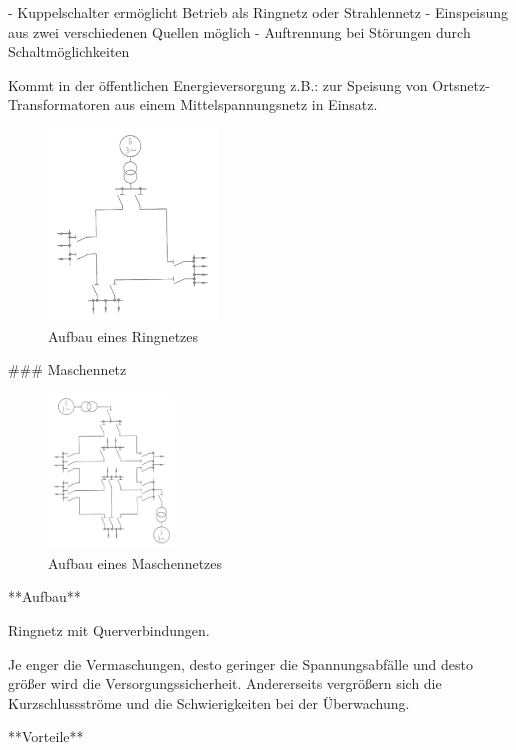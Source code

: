 \begin{markdown}
- Kuppelschalter ermöglicht Betrieb als Ringnetz oder Strahlennetz
- Einspeisung aus zwei verschiedenen Quellen möglich
- Auftrennung bei Störungen durch Schaltmöglichkeiten

Kommt in der öffentlichen Energieversorgung z.B.: zur Speisung von Ortsnetz-Transformatoren aus einem Mittelspannungsnetz in Einsatz.

\begin{figure}[H]
    \centering
    \includegraphics[width=0.4\textwidth]{./images/01-Netze/Ringnetz.png}
    \caption[Aufbau eines Ringnetzes]{Aufbau eines Ringnetzes}
\end{figure}

### Maschennetz

\begin{figure}
    \centering
    \includegraphics[width=0.3\textwidth]{./images/01-Netze/Maschennetz.png}
    \caption[Aufbau eines Maschennetzes]{Aufbau eines Maschennetzes}
\end{figure}

**Aufbau**

Ringnetz mit Querverbindungen.

Je enger die Vermaschungen, desto geringer die Spannungsabfälle und desto größer wird die Versorgungssicherheit. Andererseits vergrößern sich die Kurzschlussströme und die Schwierigkeiten bei der Überwachung.

**Vorteile**


\end{markdown}
